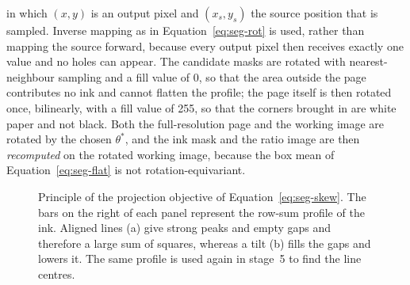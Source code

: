 in which $(x,y)$ is an output pixel and $(x_s,y_s)$ the source position that is sampled.
Inverse mapping as in Equation~\ref{eq:seg-rot} is used, rather than mapping the source forward, because every output pixel then receives exactly one value and no holes can appear.
The candidate masks are rotated with nearest-neighbour sampling and a fill value of 0, so that the area outside the page contributes no ink and cannot flatten the profile; the page itself is then rotated once, bilinearly, with a fill value of 255, so that the corners brought in are white paper and not black.
Both the full-resolution page and the working image are rotated by the chosen $\theta^*$, and the ink mask and the ratio image are then \emph{recomputed} on the rotated working image, because the box mean of Equation~\ref{eq:seg-flat} is not rotation-equivariant.

\begin{figure}[h]
\centering
{}
\caption{Principle of the projection objective of Equation~\ref{eq:seg-skew}. The bars on the right of each panel represent the row-sum profile of the ink. Aligned lines (a) give strong peaks and empty gaps and therefore a large sum of squares, whereas a tilt (b) fills the gaps and lowers it. The same profile is used again in stage~5 to find the line centres.}
\label{fig:seg-skew}
\end{figure}

